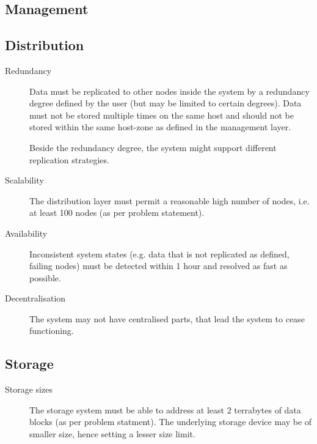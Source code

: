 \subsection{Management}

\subsection{Distribution}
\begin{description}
	\item[Redundancy]
		Data must be replicated to other nodes inside the system by a redundancy degree defined by the user (but may be limited to certain degrees). Data must not be stored multiple times on the same host and should not be stored within the same host-zone as defined in the management layer.

		Beside the redundancy degree, the system might support different replication strategies.
	\item[Scalability]
		The distribution layer must permit a reasonable high number of nodes, i.e. at least 100 nodes (as per problem statement). %
	\item[Availability]
		Inconsistent system states (e.g. data that is not replicated as defined, failing nodes) must be detected within 1 hour and resolved as fast as possible.
	\item[Decentralisation]
		The system may not have centralised parts, that lead the system to cease functioning.
\end{description}

\subsection{Storage}
\begin{description}
\item[Storage sizes]
	The storage system must be able to address at least 2 terrabytes of data blocks (as per problem statment). The underlying storage device may be of smaller size, hence setting a lesser size limit.
\end{description}
